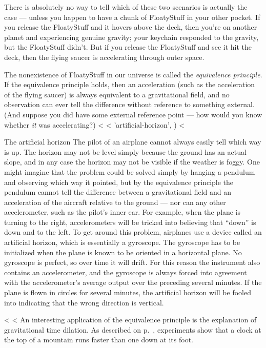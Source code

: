 There is absolutely no way to tell which of these two scenarios is actually the case --- unless you happen to have
a chunk of FloatyStuff in your other pocket. If you release the FloatyStuff and it hovers above the deck,
then you're on another planet and experiencing genuine gravity; your keychain responded to the gravity, but
the FloatyStuff didn't. But if you release the FloatyStuff and see it hit the deck, then the flying saucer is
accelerating through outer space.

The nonexistence of FloatyStuff in our universe is called the \emph{equivalence principle}. If the equivalence
principle holds, then an acceleration (such as the acceleration of the flying saucer) is always equivalent to
a gravitational field, and no observation can ever tell the difference without reference to something external.
(And suppose you did have some external reference point --- how would you know whether \emph{it} was accelerating?)
<%
<%
    'artificial-horizon',
  )
<%

\begin{eg}{The artificial horizon}
The pilot of an airplane cannot always easily tell which way is up. The horizon may not be level simply because the ground has an actual slope, and
in any case the horizon may not be visible if the weather is foggy. One might imagine that the problem could be solved simply by hanging a pendulum
and observing which way it pointed, but by the equivalence principle the pendulum cannot tell the difference between a gravitational field and an acceleration
of the aircraft relative to the ground --- nor can any other accelerometer, such as the pilot's inner ear. For example, when the plane is turning to the right,
accelerometers will be tricked into believing that ``down'' is down and to the left. To get around this problem, airplanes use a device called an artificial
horizon, which is essentially a gyroscope. The gyroscope has to be initialized when the plane is known to be oriented in a horizontal plane.
No gyroscope is perfect, so over time it will drift. For this reason the instrument also contains an accelerometer, and the gyroscope is
always forced into agreement with the accelerometer's average output over the preceding several minutes. If the plane is flown in circles for
several minutes, the artificial horizon will be fooled into indicating that the wrong direction is vertical.
\end{eg}
<%
<%
An interesting application of the equivalence principle is the explanation of gravitational time dilation. As described
on p.~\pageref{iijima}, experiments show that a clock at the top of a mountain runs faster than one down at its
foot.

